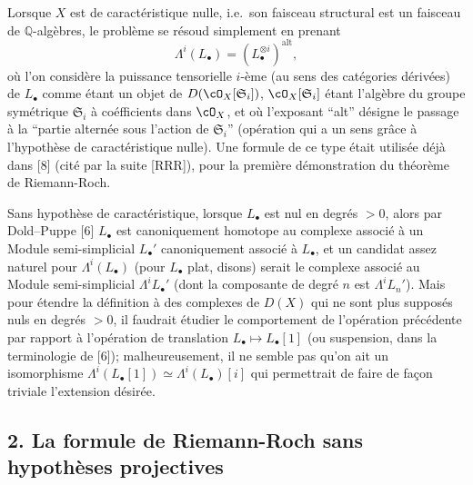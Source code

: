 Lorsque $X$ est de caract\'eristique nulle, i.e.\ son faisceau structural est un faisceau de $\mathbb{Q}$-alg\`ebres, le probl\`eme se r\'esoud simplement en prenant
\[
\Lambda^i(L_\bullet) = (L_\bullet^{\otimes i})^{\mathrm{alt}}, \tag{1.2}
\]
o\`u l'on consid\`ere la puissance tensorielle $i$-\`eme (au sens des cat\'egories d\'eriv\'ees) de $L_\bullet$ comme \'etant un objet de $D(\cO_X[\mathfrak{S}_i])$, $\cO_X[\mathfrak{S}_i]$ \'etant l'alg\`ebre du groupe sym\'etrique $\mathfrak{S}_i$ \`a co\'efficients dans $\cO_X$, et o\`u l'exposant ``alt'' d\'esigne le passage \`a la ``partie altern\'ee sous l'action de $\mathfrak{S}_i$'' (op\'eration qui a un sens gr\^ace \`a l'hypoth\`ese de caract\'eristique nulle). Une formule de ce type \'etait utilis\'ee d\'ej\`a dans [8] (cit\'e par la suite [RRR]), pour la premi\`ere d\'emonstration du th\'eor\`eme de Riemann-Roch.

Sans hypoth\`ese de caract\'eristique, lorsque $L_\bullet$ est nul en degr\'es $> 0$, alors par Dold--Puppe [6] $L_\bullet$ est canoniquement homotope au complexe associ\'e \`a un Module semi-simplicial $L_\bullet'$ canoniquement associ\'e \`a $L_\bullet$, et un candidat assez naturel pour $\Lambda^i(L_\bullet)$ (pour $L_\bullet$ plat, disons) serait le complexe associ\'e au Module semi-simplicial $\Lambda^i L_\bullet'$ (dont la composante de degr\'e $n$ est $\Lambda^i L_n'$). Mais pour \'etendre la d\'efinition \`a des complexes de $D(X)$ qui ne sont plus suppos\'es nuls en degr\'es $> 0$, il faudrait \'etudier le comportement de l'op\'eration pr\'ec\'edente par rapport \`a l'op\'eration de translation $L_\bullet \mapsto L_\bullet[1]$ (ou suspension, dans la terminologie de [6]); malheureusement, il ne semble pas qu'on ait un isomorphisme $\Lambda^i(L_\bullet[1]) \simeq \Lambda^i(L_\bullet)[i]$ qui permettrait de faire de fa\c{c}on triviale l'extension d\'esir\'ee.

\subsection*{2. La formule de Riemann-Roch sans hypoth\`eses projectives}

